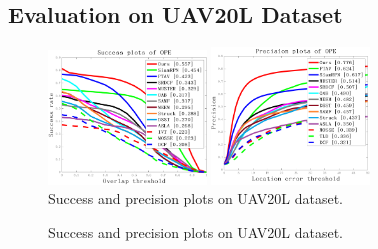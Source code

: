 \subsection{Evaluation on UAV20L Dataset}

\begin{figure}[htb]
\begin{minipage}[b]{.48\linewidth}
  \centering
  \centerline{\includegraphics[width=4.2cm]{Img/globally/UAV20L/quality_plot_overlap_OPE_AUC.png}}
\end{minipage}
\hfill
\begin{minipage}[b]{0.48\linewidth}
  \centering
  \centerline{\includegraphics[width=4.2cm]{Img/globally/UAV20L/quality_plot_error_OPE_threshold.png}}
\end{minipage}
%
\caption{Success and precision plots on UAV20L dataset.}
\label{fig:uav20l}
%
\end{figure}

\iffalse
\begin{figure}[t]
\begin{center}
\end{center}
   \caption{Success and precision plots on UAV20L dataset.}
\label{fig:uav20l}
\end{figure}

